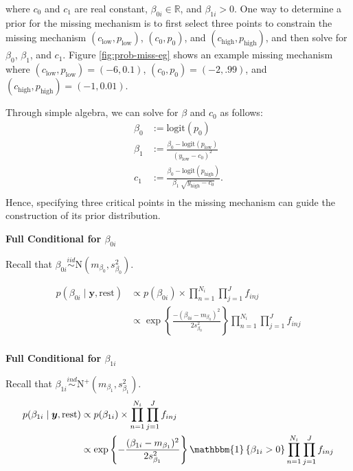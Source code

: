 \documentclass[12pt,]{article}
\newcommand{\bc}[1]{ \left\{#1\right\} }
\newcommand{\N}{ \mathcal{N} }
\def\beginmyfig{\begin{figure}[H]\center}
\def\endmyfig{\end{figure}}
\newcommand{\iid}{\overset{iid}{\sim}}
\newcommand{\ind}{\overset{ind}{\sim}}
\def\logit{\text{logit}}
\def\N{\text{N}}
\def\y{\bm{y}}
\newcommand{\Ind}[1]{\mathbbm{1}\bc{#1}}
\def\rest{\text{rest}}
\def\beginmyfig{\begin{figure}[H]\center}
\def\endmyfig{\end{figure}}
\begin{document}
where \(c_0\) and \(c_1\) are real constant, $\beta_{0i} \in \mathbb{R}$, and
$\beta_{1i} > 0$.
One way to determine a prior for the missing mechanism is to first select three
points to constrain the missing mechanism $(c_\text{low}, p_\text{low})$,
$(c_0, p_0)$, and $(c_\text{high}, p_\text{high})$, and then 
solve for $\beta_0$, $\beta_1$, and $c_1$. Figure \ref{fig:prob-miss-eg} shows
an example missing mechanism where $(c_\text{low}, p_\text{low}) = (-6,0.1)$,
$(c_0, p_0)=(-2,.99)$, and $(c_\text{high}, p_\text{high}) = (-1,0.01)$.

Through simple algebra, we can solve for $\beta$ and $c_0$ as follows:
\begin{align*}
  \beta_0 &:= \logit(p_0) \\
  \beta_1 &:= \frac{\beta_0 - \logit(p_\text{low})}{(y_\text{low} - c_0)^2} \\
  c_1 &:= \frac{\beta_0 - \logit(p_\text{high})}{\beta_1 ~ \sqrt{y_\text{high} - c_0} }. \\
\end{align*}
Hence, specifying three critical points in the missing mechanism can guide
the construction of its prior distribution.
\vspace{2em}


\textbf{Full Conditional for $\beta_{0i}$}

Recall that \(\beta_{0i} \iid \N(m_{\beta_0},s^2_{\beta_0})\).

\begin{align*}
p(\beta_{0i} \mid \y, \rest) &\propto
p(\beta_{0i}) \times \prod_{n=1}^{N_i} \prod_{j=1}^J f_{inj} \\
%
&\propto \exp\bc{\frac{-(\beta_{0i}-m_{\beta_0})^2}{2s^2_{\beta_0}}} \prod_{n=1}^{N_i} \prod_{j=1}^J f_{inj} \\
\end{align*}

\vspace{2em}


\textbf{Full Conditional for $\beta_{1i}$}

Recall that $\beta_{1i}\ind \N^+(m_{\beta_1}, s^2_{\beta_1})$.
%
\begin{align*}
p(\beta_{1i} \mid \y, \rest) &\propto
p(\beta_{1i}) \times 
\prod_{n=1}^{N_i} \prod_{j=1}^J f_{inj} \\
%
&\propto \exp\bc{-\frac{(\beta_{1i} - m_{\beta_1})^2}{2s^2_{\beta_1}}}
\Ind{\beta_{1i} > 0}
\prod_{n=1}^{N_i} \prod_{j=1}^J f_{inj} \\
\end{align*}
\end{document}

